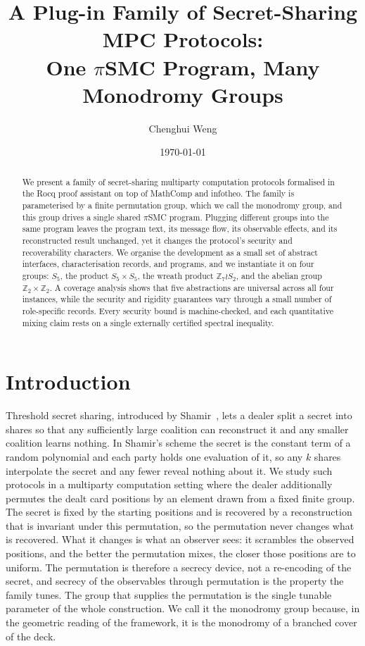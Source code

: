 \documentclass[a4paper,11pt]{article}
\title{A Plug-in Family of Secret-Sharing MPC Protocols:\\
\large One $\pi$SMC Program, Many Monodromy Groups}
\author{Chenghui Weng}
\date{\today}
\begin{document}
\maketitle

\begin{abstract}
We present a family of secret-sharing multiparty computation protocols
formalised in the Rocq proof assistant on top of MathComp and infotheo. The
family is parameterised by a finite permutation group, which we call the
monodromy group, and this group drives a single shared $\pi$SMC program.
Plugging different groups into the same program leaves the program text, its
message flow, its observable effects, and its reconstructed result unchanged,
yet it changes the protocol's security and recoverability characters. We
organise the development as a small set of abstract interfaces, characterisation
records, and programs, and we instantiate it on four groups: $S_5$, the product
$S_5 \times S_5$, the wreath product $\mathbb{Z}_7 \wr S_2$, and the abelian
group $\mathbb{Z}_2 \times \mathbb{Z}_2$. A coverage analysis shows that five
abstractions are universal across all four instances, while the security and
rigidity guarantees vary through a small number of role-specific records. Every
security bound is machine-checked, and each quantitative mixing claim rests on a
single externally certified spectral inequality.
\end{abstract}

\section{Introduction}

Threshold secret sharing, introduced by Shamir~\cite{shamir1979}, lets a dealer
split a secret into shares so that any sufficiently large coalition can
reconstruct it and any smaller coalition learns nothing. In Shamir's scheme the secret is the constant term of a random
polynomial and each party holds one evaluation of it, so any $k$ shares
interpolate the secret and any fewer reveal nothing about it. We study such
protocols in a multiparty computation setting where the dealer additionally
permutes the dealt card positions by an element drawn from a fixed finite group. The secret is fixed by the starting
positions and is recovered by a reconstruction that is invariant under this
permutation, so the permutation never changes what is recovered. What it changes
is what an observer sees: it scrambles the observed positions, and the better the
permutation mixes, the closer those positions are to uniform. The permutation is
therefore a secrecy device, not a re-encoding of the secret, and secrecy of the
observables through permutation is the property the family tunes. The group that
supplies the permutation is the single tunable parameter of the whole
construction. We call it the monodromy group because, in the geometric reading
of the framework, it is the monodromy of a branched cover of the deck.
\end{document}
